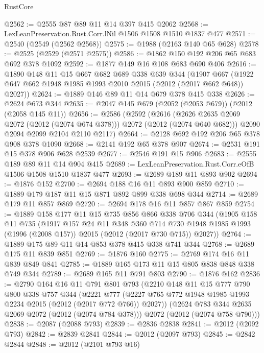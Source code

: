 \begin{lexlean}{RustCore}
\begin{coremodule}
@2562 := @2555 @87 @89 @11 @14 @397 @415 @2062
@2568 := LexLeanPreservation.Rust.Corr.lNil @1506 @1508 @1510 @1837 @477
@2571 := @2540 (@2549 (@2562 @2568))
@2575 := @1988 (@2163 @140 @65 @628)
@2578 := @2525 (@2529 (@2571 @2575))
@2586 := @1862 @150 @192 @206 @65 @683 @692 @378 @1092
@2592 := @1877 @149 @16 @108 @683 @690 @406
@2616 := @1890
    @148
    @11
    @15
    @667
    @682
    @689
    @338
    @639
    @344
    (@1907 @667 (@1922 @647 @662 @1948 @1985 @1993 @2010 @2015 (@2012 (@2017 @662 @648)) @2027))
@2624 := @1889 @146 @89 @11 @14 @679 @378 @415 @338
@2626 := @2624 @673 @344
@2635 := @2047 @145 @679 (@2052 (@2053 @679)) (@2012 (@2058 @145 @11))
@2656 := @2586
    (@2592
      (@2616 (@2626 @2635 @2069 @2072 (@2012 (@2074 @674 @378))) @2072 (@2012 (@2074 @640 @682)))
      @2090
      @2094
      @2099
      @2104
      @2110
      @2117)
@2664 := @2128 @692 @192 @206 @65 @378 @908 @378 @1090
@2668 := @2141 @192 @65 @378 @907
@2674 := @2531 @191 @15 @378 @906 @628 @2539
@2677 := @2546 @191 @15 @906
@2683 := @2555 @189 @89 @11 @14 @904 @415
@2689 := LexLeanPreservation.Rust.Corr.eOfB @1506 @1508 @1510 @1837 @477
@2693 := @2689 @189 @11 @893 @902
@2694 := @1876 @152
@2700 := @2694 @188 @16 @11 @893 @900 @859
@2710 := @1889 @179 @187 @11 @15 @871 @892 @899 @338 @698 @344
@2714 := @2689 @179 @11 @857 @869
@2720 := @2694 @178 @16 @11 @857 @867 @859
@2754 := @1889
    @158
    @177
    @11
    @15
    @735
    @856
    @866
    @338
    @706
    @344
    (@1905
      @158
      @11
      @735
      (@1917
        @157
        @24
        @11
        @348
        @360
        @714
        @730
        @1948
        @1985
        @1993
        (@1996 (@2008 @157))
        @2015
        (@2012 (@2017 @730 @715))
        @2027))
@2764 := @1889 @175 @89 @11 @14 @853 @378 @415 @338 @741 @344
@2768 := @2689 @175 @11 @839 @851
@2769 := @1876 @160
@2775 := @2769 @174 @16 @11 @839 @849 @841
@2785 := @1889 @165 @173 @11 @15 @805 @838 @848 @338 @749 @344
@2789 := @2689 @165 @11 @791 @803
@2790 := @1876 @162
@2836 := @2790
    @164
    @16
    @11
    @791
    @801
    @793
    (@2210
      @148
      @11
      @15
      @777
      @790
      @800
      @338
      @757
      @344
      (@2221 @777 (@2227 @765 @772 @1948 @1985 @1993 @2234 @2015 (@2012 (@2017 @772 @766)) @2027))
      (@2624 @783 @344 @2635 @2069 @2072 (@2012 (@2074 @784 @378)))
      @2072
      (@2012 (@2074 @758 @790)))
@2838 := @2087 (@2088 @793)
@2839 := @2836 @2838
@2841 := @2012 (@2092 @793)
@2842 := @2839 @2841
@2844 := @2012 (@2097 @793)
@2845 := @2842 @2844
@2848 := @2012 (@2101 @793 @16)

\end{coremodule}
\end{lexlean}
